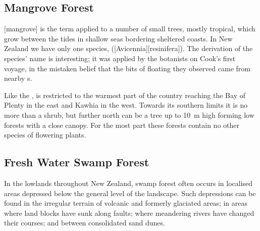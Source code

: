 \subsection{Mangrove Forest}

[mangrove] is the term applied to a number of small trees, mostly tropical, which grow between the tides in shallow seas bordering sheltered coasts.
In New Zealand we have only one species,  ([Avicennia][resinifera]).
The derivation of the species' name is interesting; it was applied by the botanists on Cook's first voyage, in the mistaken belief that the bits of floating  they observed came from nearby s.

Like the ,  is restricted to the warmest part of the country reaching the Bay of Plenty in the east and Kawhia in the west.
Towards its southern limits it is no more than a shrub, but further north  can be a tree up to \SI{10}{\metre} high forming low forests with a close canopy.
For the most part these forests contain no other species of flowering plants.

\subsection{Fresh Water Swamp Forest}

In the lowlands throughout New Zealand, swamp forest often occurs in localised areas depressed below the general level of the landscape.
Such depressions can be found in the irregular terrain of volcanic and formerly glaciated areas; in areas where land blocks have sunk along faults; where meandering rivers have changed their courses; and between consolidated sand dunes.



